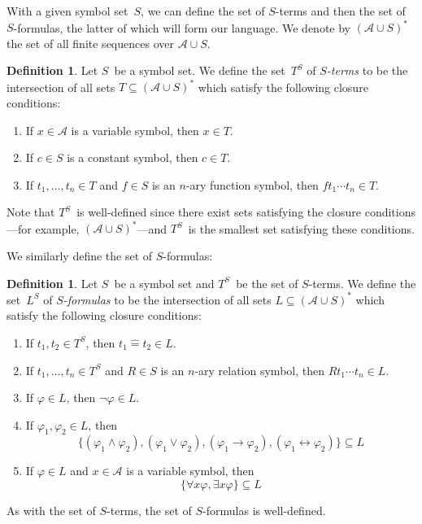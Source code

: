 \documentclass[letterpaper]{article}
\newcommand{\lequ}{\mathrel{\widehat{=}}}
\newcommand{\limp}{\rightarrow}
\newcommand{\liff}{\leftrightarrow}
\newcommand{\union}{\cup}
\numberwithin{equation}{section}
\theoremstyle{plain}
\theoremstyle{definition}
\newtheorem{defn}[equation]{Definition}
\begin{document}
With a given symbol set~$S$, we can define the set of $S$-terms and then the set of $S$-formulas, the latter of which will form our language. We denote by $(\mathcal{A}\union S)^*$ the set of all finite sequences over $\mathcal{A}\union S$.
\begin{defn}
Let $S$~be a symbol set. We define the set~$T^S$ of \emph{$S$-terms} to be the intersection of all sets $T\subseteq(\mathcal{A}\union S)^*$ which satisfy the following closure conditions:
\begin{enumerate}[itemsep=0pt]
\item If $x\in\mathcal{A}$ is a variable symbol, then $x\in T$.
\item If $c\in S$ is a constant symbol, then $c\in T$.
\item If $t_1,\ldots,t_n\in T$ and $f\in S$ is an $n$-ary function symbol, then $ft_1\cdots t_n\in T$.
\end{enumerate}
\label{defn:terms}
\end{defn}
\noindent Note that $T^S$~is well-defined since there exist sets satisfying the closure conditions---for example, $(\mathcal{A}\union S)^*$---and $T^S$~is the smallest set satisfying these conditions.

We similarly define the set of $S$-formulas:
\begin{defn}
Let $S$~be a symbol set and $T^S$~be the set of $S$-terms. We define the set~$L^S$ of \emph{$S$-formulas} to be the intersection of all sets $L\subseteq(\mathcal{A}\union S)^*$ which satisfy the following closure conditions:
\begin{enumerate}[itemsep=0pt]
\item If $t_1,t_2\in T^S$, then $t_1\lequ t_2\in L$.
\item If $t_1,\ldots,t_n\in T^S$ and $R\in S$ is an $n$-ary relation symbol, then $Rt_1\cdots t_n\in L$.
\item If $\varphi\in L$, then $\lnot\varphi\in L$.
\item If $\varphi_1,\varphi_2\in L$, then
$$\{(\varphi_1\land\varphi_2),(\varphi_1\lor\varphi_2),(\varphi_1\limp\varphi_2),(\varphi_1\liff\varphi_2)\}\subseteq L$$
\item If $\varphi\in L$ and $x\in\mathcal{A}$ is a variable symbol, then
$$\{\forall x\varphi,\exists x\varphi\}\subseteq L$$
\end{enumerate}
\label{defn:formulas}
\end{defn}
\noindent As with the set of $S$-terms, the set of $S$-formulas is well-defined.
\end{document}
